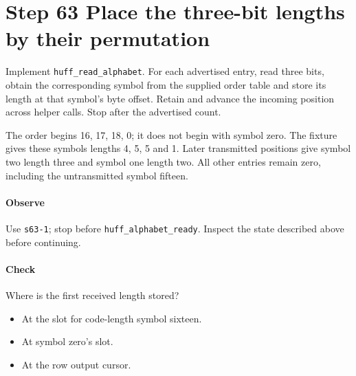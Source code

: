 \section{Step 63 Place the three-bit lengths by their permutation}\label{png-huff-s63}
Implement \texttt{huff\_read\_alphabet}. For each advertised entry, read three bits, obtain the corresponding symbol from the supplied order table and store its length at that symbol's byte offset. Retain and advance the incoming position across helper calls. Stop after the advertised count.

The order begins 16, 17, 18, 0; it does not begin with symbol zero. The fixture gives these symbols lengths 4, 5, 5 and 1. Later transmitted positions give symbol two length three and symbol one length two. All other entries remain zero, including the untransmitted symbol fifteen.

\paragraph{Observe} Use \texttt{s63-1}; stop before \texttt{huff\_alphabet\_ready}. Inspect the state described above before continuing.

\paragraph{Check} Where is the first received length stored?
\begin{itemize}
  \item[A.] At the slot for code-length symbol sixteen.
  \item[B.] At symbol zero’s slot.
  \item[C.] At the row output cursor.
\end{itemize}
